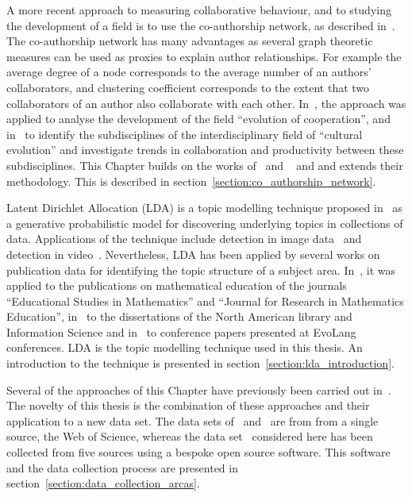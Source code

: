 A more recent approach to measuring collaborative behaviour, and to studying the
development of a field is to use the co-authorship network, as described
in~\cite{Liu2015}. The co-authorship network has many advantages as several
graph theoretic measures can be used as proxies to explain author relationships.
For example the average degree of a node corresponds to the average number of
an authors' collaborators, and clustering coefficient corresponds to the extent that
two collaborators of an author also collaborate with each other.
In~\cite{Liu2015}, the approach was applied to analyse the development of the field
``evolution of cooperation'', and in~\cite{youngblood2018} to identify the
subdisciplines of the interdisciplinary field of ``cultural evolution'' and
investigate trends in collaboration and productivity between these subdisciplines.
This Chapter builds on the works of~\cite{Liu2015} and ~\cite{youngblood2018} and
and extends their methodology. This is described in
section~\ref{section:co_authorship_network}.

Latent Dirichlet Allocation (LDA) is a topic modelling technique proposed
in~\cite{Blei2003} as a generative probabilistic model for discovering
underlying topics in collections of data.
Applications of the technique include detection in image data~\cite{Agarwal2008,
Coelho2010} and detection in video~\cite{Niebles2008, Wang2008}. Nevertheless,
LDA has been applied by several works on publication data for identifying the
topic structure of a subject area. In~\cite{Inglis2018}, it was applied to the
publications on mathematical education of the journals ``Educational Studies in
Mathematics'' and ``Journal for Research in Mathematics Education'', in~\cite{Sugimoto2011}
to the dissertations of the North American library and Information Science and
in~\cite{Bergmann2018} to conference papers presented at EvoLang conferences.
LDA is the topic modelling technique used in this thesis. An introduction to
the technique is presented in section~\ref{section:lda_introduction}.

Several of the approaches of this Chapter have previously been carried
out in~\cite{Bergmann2018,Liu2015,Sugimoto2011, youngblood2018}. The novelty of this
thesis is the combination of these approaches and their application to a new data
set. The data sets of~\cite{Liu2015} and~\cite{youngblood2018} are from 
from a single source, the Web of Science, whereas the data set~\cite{pd_data_2018}
considered here has been collected from five sources using a bespoke open source
software. This software and the data collection process are presented in
section~\ref{section:data_collection_arcas}.

